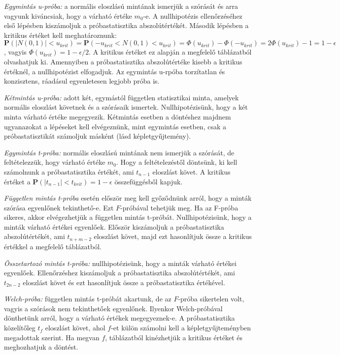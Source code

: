 \emph{Egymintás u-próba:} a normális eloszlású mintának ismerjük a szórását és arra vagyunk kiváncsiak, hogy a várható értéke $m_0$-e. A nullhipotézis ellenőrzéséhez első lépésben kiszámoljuk a próbastatisztika abszolútértékét. Második lépésben a kritikus értéket kell meghatároznunk: $\mathbf{P}(|N(0,1)| < u_{krit})= \mathbf{P}(-u_{krit} < N(0,1) < u_{krit}) = \Phi(u_{krit}) - \Phi(-u_{krit}) = 2 \Phi(u_{krit}) -1 = 1-\epsilon$, vagyis $\Phi(u_{krit}) = 1-\epsilon/2$. A kritikus értéket ez alapján a megfelelő táblázatból olvashatjuk ki. Amennyiben a próbastatisztika abszolútértéke kisebb a kritikus értéknél, a nullhipotézist elfogadjuk. Az egymintás u-rpóba torzítatlan és konzisztens, ráadásul egyenletesen legjobb próba is.

\emph{Kétmintás u-próba:} adott két, egymástól független statisztikai minta, amelyek normális eloszlást követnek és a szórásaik ismertek. Nullhipotézisünk, hogy a két minta várható értéke megegyezik. Kétmintás esetben a döntéshez majdnem ugyanazokat a lépéseket kell elvégeznünk, mint egymintás esetben, csak a próbastatisztikát számoljuk másként (lásd képletgyűjtemény).

\emph{Egymintás t-próba:} normális eloszlású mintának nem ismerjük a szórását, de feltételezzük, hogy várható értéke $m_0$. Hogy a feltételezéstől döntsünk, ki kell számolnunk a próbastatisztika értékét, ami $t_{n-1}$ eloszlást követ. A kritikus értéket a $\mathbf{P}(|t_{n-1}| < t_{krit}) = 1-\epsilon$ összefüggésből kapjuk.

\emph{Független mintás t-próba} esetén először meg kell győződnünk arról, hogy a minták szórása egyenlőnek tekinthető-e. Ezt $F$-próbával tehetjük meg. Ha az F-próba sikeres, akkor elvégezhetjük a független mintás t-próbát. Nullhipotézisünk, hogy a minták várható értékei egyenlőek. Először kiszámoljuk a próbastatisztika abszolútértékét, ami $t_{n+m-2}$ eloszlást követ, majd ezt hasonlítjuk össze a kritikus értékkel a megfelelő táblázatból. 

\emph{Összetartozó mintás t-próba:} nullhipotézisünk, hogy a minták várható értékei egyenlőek. Ellenőrzéshez kiszámoljuk a próbastatisztika abszolútértékét, ami $t_{2n-2}$ eloszlást követ és ezt hasonlítjuk össze a próbastatisztika értékével.

\emph{Welch-próba:} független mintás t-próbát akartunk, de az $F$-próba sikertelen volt, vagyis a szórások nem tekinthetőek egyenlőnek. Ilyenkor Welch-próbával dönthetünk arról, hogy a várható értékek megegyeznek-e. A próbastatisztika közelítőleg $t_f$ eloszlást követ, ahol $f$-et külön számolni kell a képletgyűjteményben megadottak szerint. Ha megvan $f$, táblázatból kinézhetjük a kritikus értéket és meghozhatjuk a döntést.

